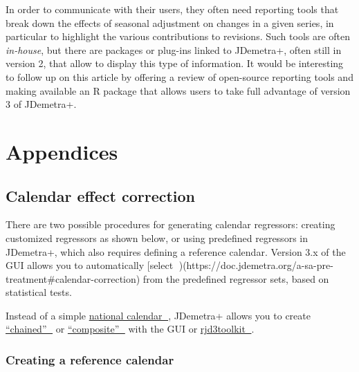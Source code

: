 \documentclass[
  letterpaper,
  DIV=11,
  numbers=noendperiod]{scrreprt}
\begin{document}
In order to communicate with their users, they often need reporting
tools that break down the effects of seasonal adjustment on changes in a
given series, in particular to highlight the various contributions to
revisions. Such tools are often \emph{in-house}, but there are packages
or plug-ins linked to JDemetra+, often still in version 2, that allow to
display this type of information. It would be interesting to follow up
on this article by offering a review of open-source reporting tools and
making available an R package that allows users to take full advantage
of version 3 of JDemetra+.

\pagebreak


\hypertarget{appendices}{%
\chapter*{Appendices}\label{appendices}}


\hypertarget{crea-regs}{%
\section*{Calendar effect correction}\label{crea-regs}}


There are two possible procedures for generating calendar regressors:
creating customized regressors as shown below, or using predefined
regressors in JDemetra+, which also requires defining a reference
calendar. Version 3.x of the GUI allows you to automatically {[}select
🔗)(https://doc.jdemetra.org/a-sa-pre-treatment\#calendar-correction)
from the predefined regressor sets, based on statistical tests.

Instead of a simple
\href{https://doc.jdemetra.org/a-calendar-correction\#national-calendar}{national
calendar 🔗}, JDemetra+ allows you to create
\href{https://doc.jdemetra.org/a-calendar-correction\#chained-calendar}{``chained''
🔗} or
\href{https://doc.jdemetra.org/a-calendar-correction\#composite-calendar}{``composite''
🔗} with the GUI or
\href{https://rjdverse.github.io/rjd3toolkit/reference/index.html\#calendars}{rjd3toolkit
🔗}.

\hypertarget{creating-a-reference-calendar}{%
\subsection*{Creating a reference
calendar}\label{creating-a-reference-calendar}}
\end{document}
